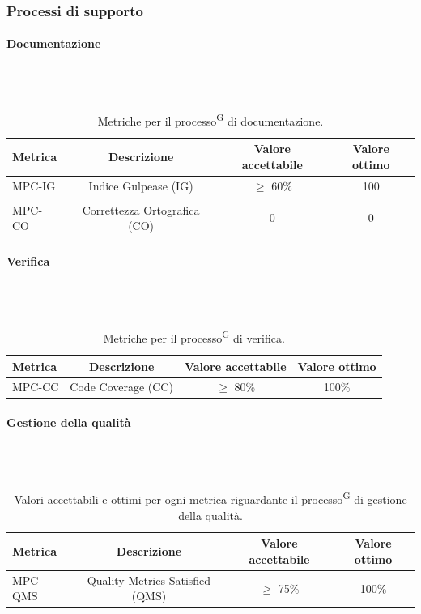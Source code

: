 \documentclass[8pt]{article}
\newcommand{\glossterm}[1]{#1\textsuperscript{G}} %
\newcommand{\subsubsubsection}[1]{\paragraph{#1}\mbox{}\\\\}
\begin{document}
\subsubsection{Processi di supporto}
\subsubsubsection{Documentazione}
\begin{table}[h]	
	\centering
	\begin{tabular}{lccc}
		\toprule
		\textbf{Metrica}& \textbf{Descrizione} & \textbf{Valore accettabile} & \textbf{Valore ottimo} \\
		\midrule
		MPC-IG & Indice Gulpease (IG) & $\geq$ 60\% & 100 \\\\
		MPC-CO & Correttezza Ortografica (CO) & 0 & 0 \\
		\bottomrule
	\end{tabular}
	\caption{Metriche per il \glossterm{processo} di documentazione.}
	\label{table:Tabella delle metriche per il processo di documentazione}
\end{table}
\subsubsubsection{Verifica}
\begin{table}[h]	
	\centering
	\begin{tabular}{lccc}
		\toprule
		\textbf{Metrica}& \textbf{Descrizione} & \textbf{Valore accettabile} & \textbf{Valore ottimo} \\
		\midrule
		MPC-CC & Code Coverage (CC) & $\geq$ 80\% & 100\% \\
		\bottomrule
	\end{tabular}
	\caption{Metriche per il \glossterm{processo} di verifica.}
	\label{table:Tabella delle metriche per il processo di verifica}
\end{table}
\subsubsubsection{Gestione della qualità}
\begin{table}[H]	
	\centering
	\begin{tabular}{lccc}
		\toprule
		\textbf{Metrica}& \textbf{Descrizione} & \textbf{Valore accettabile} & \textbf{Valore ottimo} \\
		\midrule
		MPC-QMS & Quality Metrics Satisfied (QMS) & $\geq$ 75\%& 100\%\\
		\bottomrule
	\end{tabular}
	\caption{Valori accettabili e ottimi per ogni metrica riguardante il \glossterm{processo} di gestione della qualità.}
	\label{table:Valori accettabili e ottimi per ogni metrica riguardante il processo di gestione della qualità.}
\end{table}
\clearpage
\end{document}
